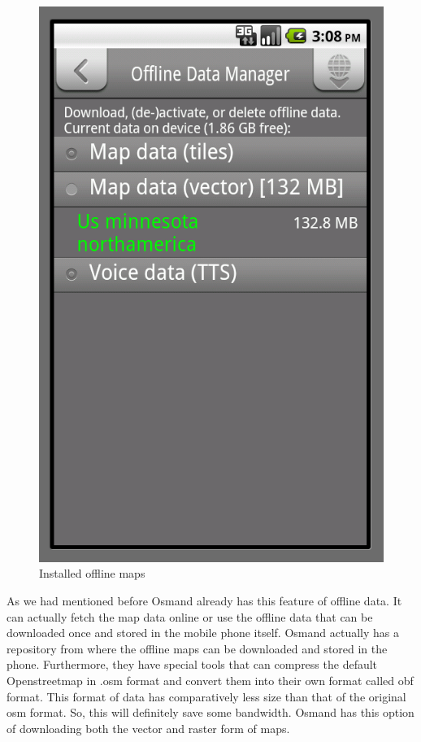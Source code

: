 \documentclass[a4paper,12pt, notitlepage, oneside, onecolumn]{article}
\begin{document}
\begin{figure}[ht]
\begin{minipage}[b]{0.5\linewidth}
\includegraphics[scale=0.3]{offline_map_detail.png}
\caption{Installed offline maps}
\label{fig:offline_map_detail}
\end{minipage}
\end{figure}

As we had mentioned before Osmand already has this feature of offline data. It can actually fetch the map data online or use the offline data that can be downloaded once and stored in the mobile phone itself. Osmand actually has a repository from where the offline maps can be downloaded and stored in the phone. Furthermore, they have special tools that can compress the default Openstreetmap in .osm format and convert them into their own format called obf format. This format of data has comparatively less size than that of the original osm format. So, this will definitely save some bandwidth. Osmand has this option of downloading both the vector and raster form of maps.\\
\end{document}
